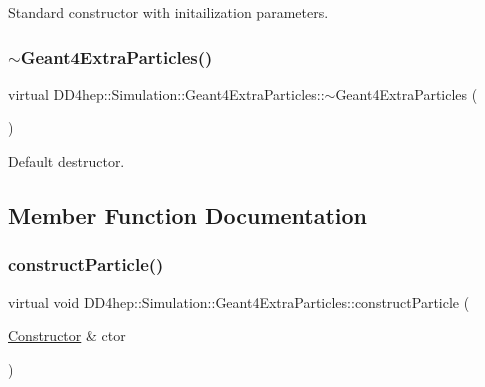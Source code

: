 Standard constructor with initailization parameters. 

\hypertarget{class_d_d4hep_1_1_simulation_1_1_geant4_extra_particles_aca6485d81b22fb87183c62b06da3df17}{}\label{class_d_d4hep_1_1_simulation_1_1_geant4_extra_particles_aca6485d81b22fb87183c62b06da3df17} 
\subsubsection{\texorpdfstring{$\sim$\+Geant4\+Extra\+Particles()}{~Geant4ExtraParticles()}}
{\footnotesize\ttfamily virtual D\+D4hep\+::\+Simulation\+::\+Geant4\+Extra\+Particles\+::$\sim$\+Geant4\+Extra\+Particles (\begin{DoxyParamCaption}{ }\end{DoxyParamCaption})\hspace{0.3cm}{\ttfamily [virtual]}}



Default destructor. 



\subsection{Member Function Documentation}
\hypertarget{class_d_d4hep_1_1_simulation_1_1_geant4_extra_particles_ad256c3419ba5c43c223157434f74ae49}{}\label{class_d_d4hep_1_1_simulation_1_1_geant4_extra_particles_ad256c3419ba5c43c223157434f74ae49} 
\subsubsection{\texorpdfstring{construct\+Particle()}{constructParticle()}}
{\footnotesize\ttfamily virtual void D\+D4hep\+::\+Simulation\+::\+Geant4\+Extra\+Particles\+::construct\+Particle (\begin{DoxyParamCaption}\item[{\hyperlink{class_d_d4hep_1_1_simulation_1_1_geant4_physics_constructor_1_1_constructor}{Constructor} \&}]{ctor }\end{DoxyParamCaption})\hspace{0.3cm}{\ttfamily [virtual]}}



